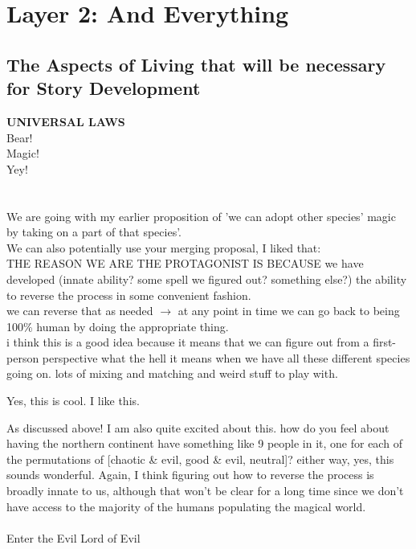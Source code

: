 \chapter*{Layer 2: And Everything}

\section*{The Aspects of Living that will be necessary for Story Development} 

\R \textbf{UNIVERSAL LAWS} \\ Bear! \\ Magic! \\ Yey! \\ \\ \\


We are going with my earlier proposition of 'we can adopt other species' magic
by taking on a part of that species'. \\ We can also potentially use your
merging proposal, I liked that: \\ THE REASON WE ARE THE PROTAGONIST IS BECAUSE
we have developed (innate ability? some spell we figured out? something else?)
the ability to reverse the process in some convenient fashion. \\ we can reverse
that as needed $\rightarrow$ at any point in time we can go back to being 100\%
human by doing the appropriate thing. \\ i think this is a good idea because it
means that we can figure out from a first-person perspective what the hell it
means when we have all these different species going on. lots of mixing and
matching and weird stuff to play with.

\A Yes, this is cool. I like this. 

\R As discussed above!  I am also quite excited about this.  how do you feel
about having the northern continent have something like 9 people in it, one for
each of the permutations of [chaotic \& evil, good \& evil, neutral]?  either
way, yes, this sounds wonderful.  Again, I think figuring out how to reverse the
process is broadly innate to us, although that won't be clear for a long time
since we don't have access to the majority of the humans populating the magical
world. \\ \\

Enter the Evil Lord of Evil \\

